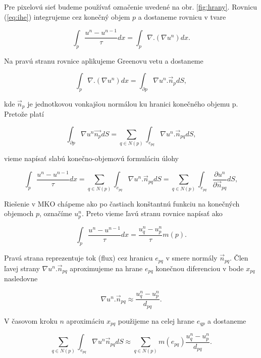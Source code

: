 \documentclass[a4paper,11pt,oneside]{article}%
\begin{document}
Pre pixelovú sieť budeme používať označenie uvedené na obr. \ref{fig:hrany}.
Rovnicu (\ref{eq:ihe}) integrujeme cez konečný objem $p$ a dostaneme rovnicu v tvare

\begin{equation} 
\int_p\frac{u^n - u^{n-1}}{\tau} dx = \int_p\nabla . (\nabla u^n)dx.
\end{equation}

Na pravú stranu rovnice aplikujeme Greenovu vetu a dostaneme

\begin{equation} 
\int_p\nabla . (\nabla u^n)dx = \int_{\partial p} \nabla u^n . \vec{n}_pdS,
\end{equation}

kde $\vec{n}_p$ je jednotkovou vonkajšou normálou ku hranici konečného objemu p.
Pretože platí

\begin{equation} 
\int_{\partial p} \nabla u^n \vec{n_p}dS = \sum_{q\in N(p)}\int_{e_{pq}} \nabla u^n . \vec{n}_{pq}dS,
\end{equation}

vieme napísať slabú konečno-objemovú formuláciu úlohy

\begin{equation} 
\int_p\frac{u^n - u^{n-1}}{\tau} dx = \sum_{q\in N(p)}\int_{e_{pq}} \nabla u^n . \vec{n}_{pq}dS = \sum_{q\in N(p)}\int_{e_{pq}} \frac{\partial u^n}{\partial \vec{n}_{pq}} dS,
\end{equation}

Riešenie v MKO chápeme ako po častiach konštantnú funkciu na konečných objemoch $p$, označíme $u_p^n$. Preto vieme ľavú stranu rovnice napísať ako 

\begin{equation} 
\int_p\frac{u^n - u^{n-1}}{\tau} dx = \frac{u^n_q - u^n_p}{\tau} m(p).
\end{equation}

Pravá strana reprezentuje tok (flux) cez hranicu $e_{pq}$ v smere normály $\vec{n}_{pq}$. Člen ľavej strany $\nabla u^n . \vec{n}_{pq}$ aproximujeme na hrane $e_{pq}$ konečnou diferenciou v bode $x_{pq}$ nasledovne

\begin{equation}
\nabla u^n . \vec{n}_{pq} \approx \frac{u^n_q - u^n_p}{d_{pq}}.
\end{equation}

V časovom kroku $n$ aproximáciu $x_{pq}$ použijeme na celej hrane $e_{qp}$ a dostaneme

\begin{equation}
\sum_{q\in N(p)} \int_{e_{pq}} \nabla u^n \vec{n}_{pq} dS \approx \sum_{q\in N(p)} m(e_{pq})\frac{u^n_q - u^n_p}{d_{pq}}.
\end{equation}
\end{document}
